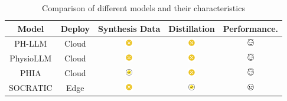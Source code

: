 \documentclass[preprint,12pt]{elsarticle}
\begin{document}
\begin{table}[htbp]
\caption{Comparison of different models and their characteristics}
\label{tab:model-comparison}
\centering
\begin{tabular}{|c|c|c|c|c|}
\hline
\rowcolor{gray!20}
Model & Deploy & Synthesis Data & Distillation & Performance. \\
\hline
\rowcolor{pink!20}
PH-LLM & Cloud & \includegraphics[height=10pt]{wrong.png} & \includegraphics[height=10pt]{wrong.png} & \includegraphics[height=10pt]{goods.png} \\
\hline
\rowcolor{pink!20}
PhysioLLM & Cloud & \includegraphics[height=10pt]{wrong.png} & \includegraphics[height=10pt]{wrong.png} & \includegraphics[height=10pt]{goods.png} \\
\hline
\rowcolor{pink!20}
PHIA & Cloud & \includegraphics[height=10pt]{correct.png} & \includegraphics[height=10pt]{wrong.png} & \includegraphics[height=10pt]{goods.png} \\
\hline
\rowcolor{green!20}
SOCRATIC & Edge & \includegraphics[height=10pt]{wrong.png} & \includegraphics[height=10pt]{correct.png} & \includegraphics[height=10pt]{soso.png} \\

\end{tabular}
\end{table}
\end{document}
